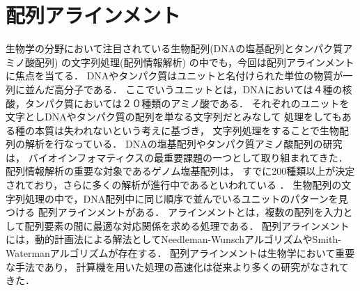 \section{配列アラインメント}
生物学の分野において注目されている生物配列(DNAの塩基配列とタンパク質アミノ酸配列) の文字列処理(配列情報解析)
\cite{浅井潔2000配列情報と確立モデル,後藤修1998マルチプルアラインメントは生体高分子情報の交差点}
の中でも，今回は配列アラインメントに焦点を当てる．
DNAやタンパク質はユニットと名付けられた単位の物質が一列に並んだ高分子である．
ここでいうユニットとは，DNAにおいては４種の核酸，タンパク質においては２０種類のアミノ酸である．
それぞれのユニットを文字としDNAやタンパク質の配列を単なる文字列だとみなして
処理をしてもある種の本質は失われないという考えに基づき，
文字列処理をすることで生物配列の解析を行なっている．
DNAの塩基配列やタンパク質アミノ酸配列の研究は，
バイオインフォマティクスの最重要課題の一つとして取り組まれてきた．
配列情報解析の重要な対象であるゲノム塩基配列は，
すでに200種類以上が決定されており，さらに多くの解析が進行中であるといわれている
\cite{浅井潔2005バイオインフォマティクス}．
生物配列の文字列処理の中で，DNA配列中に同じ順序で並んでいるユニットのパターンを見つける
配列アラインメントがある\cite{須戸里織2011バイオインフォマティクスゲノム配列から
機能解析へバイオインフォマティクスゲノム配列から機能解析へ}．
アラインメントとは，複数の配列を入力として配列要素の間に最適な対応関係を求める処理である．
配列アラインメントには，動的計画法による解法としてNeedleman-Wunschアルゴリズム\cite{needleman1970general}やSmith-Watermanアルゴリズム\cite{smith1981identification}が存在する．
配列アラインメントは生物学において重要な手法であり，
計算機を用いた処理の高速化は従来より多くの研究がなされてきた\cite{須戸里織2011gpu,宗川裕馬2008統合開発環境,sandes2011smith,liu2015accelerating,伊野文彦2007gpu}．

